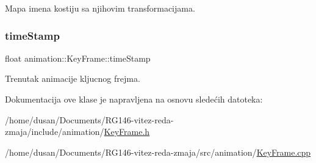 Mapa imena kostiju sa njihovim transformacijama. 

\mbox{\label{classanimation_1_1KeyFrame_ab8aa2370d72822b00f0528c69b9a5932}} 
\subsubsection{\texorpdfstring{time\+Stamp}{timeStamp}}
{\footnotesize\ttfamily float animation\+::\+Key\+Frame\+::time\+Stamp\hspace{0.3cm}{\ttfamily [private]}}



Trenutak animacije kljucnog frejma. 



Dokumentacija ove klase je napravljena na osnovu sledećih datoteka\+:\begin{DoxyCompactItemize}
\item 
/home/dusan/\+Documents/\+R\+G146-\/vitez-\/reda-\/zmaja/include/animation/\hyperlink{KeyFrame_8h}{Key\+Frame.\+h}\item 
/home/dusan/\+Documents/\+R\+G146-\/vitez-\/reda-\/zmaja/src/animation/\hyperlink{KeyFrame_8cpp}{Key\+Frame.\+cpp}\end{DoxyCompactItemize}
